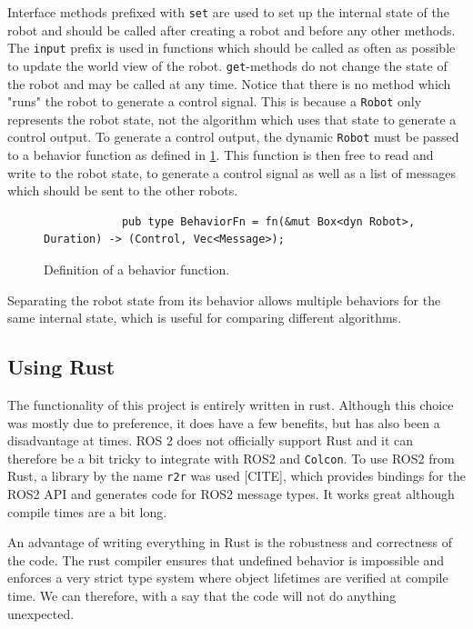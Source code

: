 Interface methods prefixed with \texttt{set} are used to set up the internal state of the robot and should be called after creating a robot and before any other methods. The \texttt{input} prefix is used in functions which should be called as often as possible to update the world view of the robot. \texttt{get}-methods do not change the state of the robot and may be called at any time. Notice that there is no method which "runs" the robot to generate a control signal. This is because a \texttt{Robot} only represents the robot state, not the algorithm which uses that state to generate a control output. To generate a control output, the dynamic \texttt{Robot} must be passed to a behavior function as defined in \cref{fig:behavior-fn}. This function is then free to read and write to the robot state, to generate a control signal as well as a list of messages which should be sent to the other robots.

\begin{figure}[H]
    \begin{center}
        \begin{verbatim}
            pub type BehaviorFn = fn(&mut Box<dyn Robot>, Duration) -> (Control, Vec<Message>);
        \end{verbatim}
    \end{center}
    \caption{Definition of a behavior function.}\label{fig:behavior-fn}
\end{figure}

Separating the robot state from its behavior allows multiple behaviors for the same internal state, which is useful for comparing different algorithms.

\subsection{Using Rust}
The {\color{red} functionality} of this project is entirely written in rust. Although this choice was mostly due to preference, it does have a few benefits, but has also been a {\color{red} disadvantage} at times. ROS 2 {\color{red} does not officially support Rust} and it can therefore be a bit tricky to integrate with ROS2 and \texttt{Colcon}. To use ROS2 from Rust, a library by the name \texttt{r2r} was used {\color{red}[CITE]}, which provides bindings for the ROS2 API and generates code for ROS2 message types. It works great although compile times are a bit long.

An advantage of writing everything in Rust is the robustness and correctness of the code. The rust compiler ensures that undefined behavior is impossible and enforces a very strict type system where object lifetimes are verified at compile time. We can therefore, with a say that the code will not do anything unexpected.


